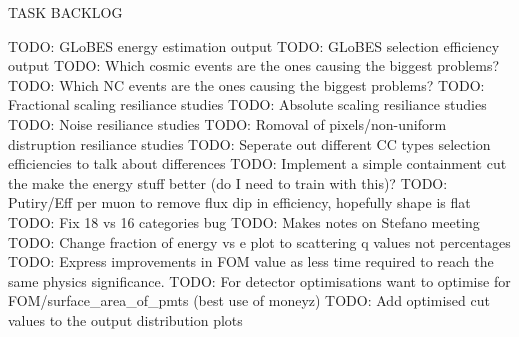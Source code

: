 TASK BACKLOG

TODO: GLoBES energy estimation output
TODO: GLoBES selection efficiency output
TODO: Which cosmic events are the ones causing the biggest problems?
TODO: Which NC events are the ones causing the biggest problems?
TODO: Fractional scaling resiliance studies
TODO: Absolute scaling resiliance studies
TODO: Noise resiliance studies
TODO: Romoval of pixels/non-uniform distruption resiliance studies
TODO: Seperate out different CC types selection efficiencies to talk about differences
TODO: Implement a simple containment cut the make the energy stuff better (do I need to train with this)?
TODO: Putiry/Eff per muon to remove flux dip in efficiency, hopefully shape is flat
TODO: Fix 18 vs 16 categories bug
TODO: Makes notes on Stefano meeting
TODO: Change fraction of energy vs e plot to scattering q values not percentages
TODO: Express improvements in FOM value as less time required to reach the same physics significance.
TODO: For detector optimisations want to optimise for FOM/surface_area_of_pmts (best use of moneyz)
TODO: Add optimised cut values to the output distribution plots